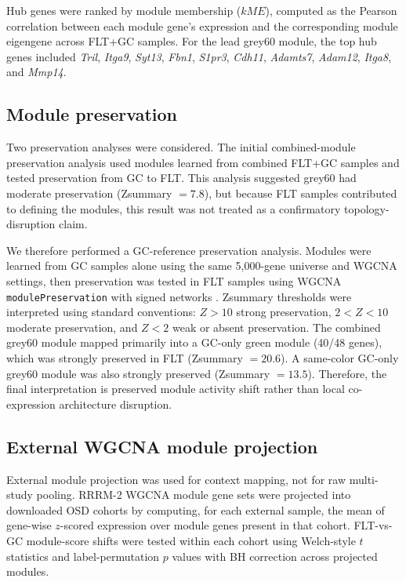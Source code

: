 \documentclass[11pt]{article}
\newcommand{\code}[1]{\texttt{#1}}
\newcommand{\gene}[1]{\textit{#1}}
\begin{document}
Hub genes were ranked by module membership ($kME$), computed as the Pearson correlation between each module gene's expression and the corresponding module eigengene across FLT+GC samples. For the lead grey60 module, the top hub genes included \gene{Tril}, \gene{Itga9}, \gene{Syt13}, \gene{Fbn1}, \gene{S1pr3}, \gene{Cdh11}, \gene{Adamts7}, \gene{Adam12}, \gene{Itga8}, and \gene{Mmp14}.

\subsection{Module preservation}

Two preservation analyses were considered. The initial combined-module preservation analysis used modules learned from combined FLT+GC samples and tested preservation from GC to FLT. This analysis suggested grey60 had moderate preservation (Zsummary $=7.8$), but because FLT samples contributed to defining the modules, this result was not treated as a confirmatory topology-disruption claim.

We therefore performed a GC-reference preservation analysis. Modules were learned from GC samples alone using the same 5,000-gene universe and WGCNA settings, then preservation was tested in FLT samples using WGCNA \code{modulePreservation} with signed networks \citep{langfelder2011preservation}. Zsummary thresholds were interpreted using standard conventions: $Z>10$ strong preservation, $2<Z<10$ moderate preservation, and $Z<2$ weak or absent preservation. The combined grey60 module mapped primarily into a GC-only green module (40/48 genes), which was strongly preserved in FLT (Zsummary $=20.6$). A same-color GC-only grey60 module was also strongly preserved (Zsummary $=13.5$). Therefore, the final interpretation is preserved module activity shift rather than local co-expression architecture disruption.

\subsection{External WGCNA module projection}

External module projection was used for context mapping, not for raw multi-study pooling. RRRM-2 WGCNA module gene sets were projected into downloaded OSD cohorts by computing, for each external sample, the mean of gene-wise $z$-scored expression over module genes present in that cohort. FLT-vs-GC module-score shifts were tested within each cohort using Welch-style $t$ statistics and label-permutation $p$ values with BH correction across projected modules.
\end{document}
